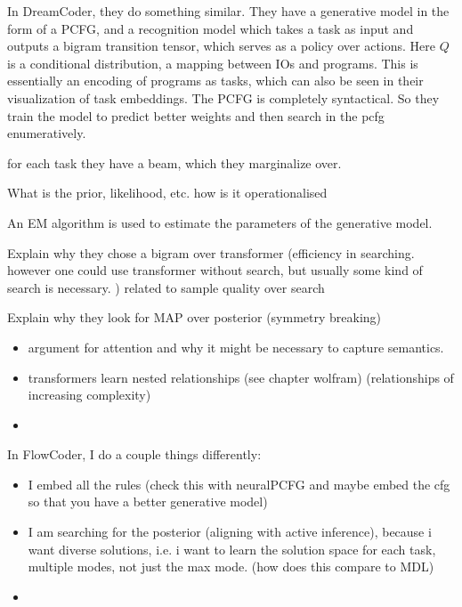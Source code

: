 % 
%
%
%
%
%
%







In DreamCoder, they do something similar. They have a generative model in the form of a PCFG, and a recognition model which takes a task as input and outputs a bigram transition tensor, which serves as a policy over actions. Here $Q$ is a conditional distribution, a mapping between IOs and programs. This is essentially an encoding of programs as tasks, which can also be seen in their visualization of task embeddings.
The PCFG is completely syntactical.
So they train the model to predict better weights and then search in the pcfg enumeratively. 

for each task they have a beam, which they marginalize over. 

What is the prior, likelihood, etc. how is it operationalised

An EM algorithm is used to estimate the parameters of the generative model. 

Explain why they chose a bigram over transformer (efficiency in searching. however one could use transformer without search, but usually some kind of search is necessary. ) related to sample quality over search

Explain why they look for MAP over posterior (symmetry breaking)

\begin{itemize}
    \item argument for attention and why it might be necessary to capture semantics.
    \item transformers learn nested relationships (see chapter wolfram) (relationships of increasing complexity)
    \item 
\end{itemize}

In FlowCoder, I do a couple things differently:

\begin{itemize}
    \item I embed all the rules (check this with neuralPCFG and maybe embed the cfg so that you have a better generative model)
    \item I am searching for the posterior (aligning with active inference), because i want diverse solutions, i.e. i want to learn the solution space for each task, multiple modes, not just the max mode. (how does this compare to MDL)
    \item 
\end{itemize}

